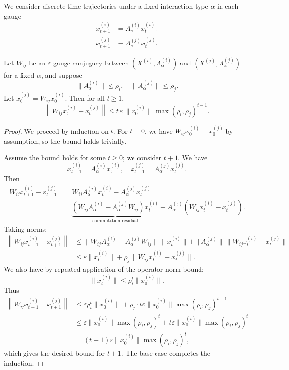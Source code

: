 \documentclass[11pt]{article}
\begin{document}
We consider discrete-time trajectories under a fixed interaction type $\alpha$ in each gauge:
\begin{align*}
  x^{(i)}_{t+1} &= A^{(i)}_\alpha x^{(i)}_t, \\
  x^{(j)}_{t+1} &= A^{(j)}_\alpha x^{(j)}_t.
\end{align*}

\begin{theorem}
\label{thm:traj-distortion}
Let $W_{ij}$ be an $\varepsilon$-gauge conjugacy between $(X^{(i)}, A^{(i)}_\alpha)$ and $(X^{(j)}, A^{(j)}_\alpha)$ for a fixed $\alpha$, and suppose
\[
  \|A^{(i)}_\alpha\| \leq \rho_i, \quad \|A^{(j)}_\alpha\| \leq \rho_j.
\]
Let $x^{(j)}_0 = W_{ij} x^{(i)}_0$. Then for all $t \ge 1$,
\[
  \left\| W_{ij} x^{(i)}_t - x^{(j)}_t \right\|
  \le t \, \varepsilon \, \|x^{(i)}_0\| \, \max(\rho_i,\rho_j)^{t-1}.
\]
\end{theorem}

\begin{proof}
We proceed by induction on $t$. For $t=0$, we have $W_{ij} x^{(i)}_0 = x^{(j)}_0$ by assumption, so the bound holds trivially.

Assume the bound holds for some $t \ge 0$; we consider $t+1$. We have
\[
  x^{(i)}_{t+1} = A^{(i)}_\alpha x^{(i)}_t, \quad
  x^{(j)}_{t+1} = A^{(j)}_\alpha x^{(j)}_t.
\]
Then
\begin{align*}
  W_{ij} x^{(i)}_{t+1} - x^{(j)}_{t+1}
  &= W_{ij} A^{(i)}_\alpha x^{(i)}_t - A^{(j)}_\alpha x^{(j)}_t \\
  &= \underbrace{\left( W_{ij} A^{(i)}_\alpha - A^{(j)}_\alpha W_{ij} \right) x^{(i)}_t}_{\text{commutation residual}} + A^{(j)}_\alpha \left( W_{ij} x^{(i)}_t - x^{(j)}_t \right).
\end{align*}
Taking norms:
\begin{align*}
  \left\| W_{ij} x^{(i)}_{t+1} - x^{(j)}_{t+1} \right\|
  &\le \|W_{ij} A^{(i)}_\alpha - A^{(j)}_\alpha W_{ij}\| \, \|x^{(i)}_t\|
     + \|A^{(j)}_\alpha\| \, \|W_{ij} x^{(i)}_t - x^{(j)}_t\| \\
  &\le \varepsilon \|x^{(i)}_t\| + \rho_j \, \|W_{ij} x^{(i)}_t - x^{(j)}_t\|.
\end{align*}
We also have by repeated application of the operator norm bound:
\[
  \|x^{(i)}_t\| \le \rho_i^t \|x^{(i)}_0\|.
\]
Thus
\begin{align*}
  \left\| W_{ij} x^{(i)}_{t+1} - x^{(j)}_{t+1} \right\|
  &\le \varepsilon \rho_i^t \|x^{(i)}_0\| + \rho_j \cdot t \varepsilon \|x^{(i)}_0\| \max(\rho_i,\rho_j)^{t-1} \\
  &\le \varepsilon \|x^{(i)}_0\| \max(\rho_i,\rho_j)^t + t \varepsilon \|x^{(i)}_0\| \max(\rho_i,\rho_j)^t \\
  &= (t+1) \varepsilon \|x^{(i)}_0\| \max(\rho_i,\rho_j)^t,
\end{align*}
which gives the desired bound for $t+1$. The base case completes the induction.
\end{proof}
\end{document}
